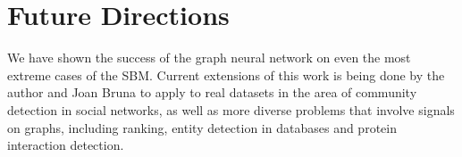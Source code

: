 \section{Future Directions}

We have shown the success of the graph neural network on even the most extreme cases of the SBM.  Current extensions of this work is being done by the author and Joan Bruna to apply to real datasets in the area of community detection in social networks, as well as more diverse problems that involve signals on graphs, including ranking, entity detection in databases and protein interaction detection. 
